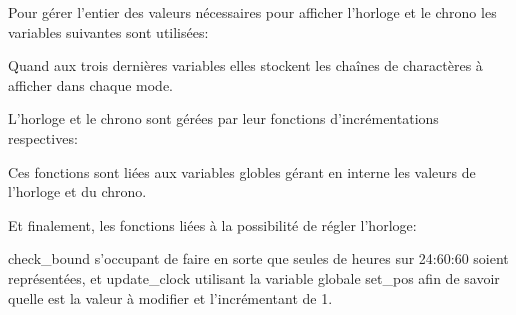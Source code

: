 Pour gérer l'entier des valeurs nécessaires pour afficher l'horloge et le chrono les variables suivantes sont utilisées:



Quand aux trois dernières variables elles stockent les chaînes de charactères à afficher dans chaque mode.

L'horloge et le chrono sont gérées par leur fonctions d'incrémentations respectives:



Ces fonctions sont liées aux variables globles gérant en interne les valeurs de l'horloge et du chrono.

Et finalement, les fonctions liées à la possibilité de régler l'horloge:



check\_bound s'occupant de faire en sorte que seules de heures sur 24:60:60 soient représentées, et update\_clock utilisant la variable globale set\_pos afin de savoir quelle est la valeur à modifier et l'incrémentant de 1.
